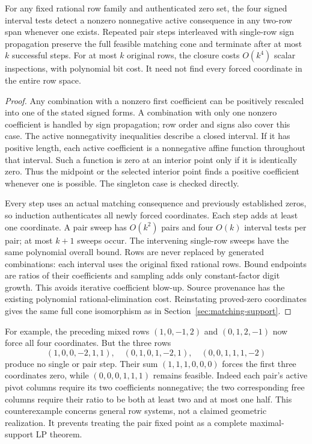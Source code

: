 \begin{proposition}
For any fixed rational row family and authenticated zero set, the four
signed interval tests detect a nonzero nonnegative active consequence in
any two-row span whenever one exists. Repeated pair steps interleaved with
single-row sign propagation preserve the full feasible matching cone and
terminate after at most $k$ successful steps. For at most $k$ original rows,
the closure costs $O(k^4)$ scalar inspections, with polynomial bit cost.
It need not find every forced coordinate in the entire row space.
\end{proposition}
\begin{proof}
Any combination with a nonzero first coefficient can be positively rescaled
into one of the stated signed forms. A combination with only one nonzero
coefficient is handled by sign propagation; row order and signs also cover
this case. The active nonnegativity inequalities describe a closed interval.
If it has positive length, each active coefficient is a nonnegative affine
function throughout that interval. Such a function is zero at an interior
point only if it is identically zero. Thus the midpoint or the selected
interior point finds a positive coefficient whenever one is possible.
The singleton case is checked directly.

Every step uses an actual matching consequence and previously established
zeros, so induction authenticates all newly forced coordinates. Each step
adds at least one coordinate. A pair sweep has $O(k^2)$ pairs and four
$O(k)$ interval tests per pair; at most $k+1$ sweeps occur. The intervening
single-row sweeps have the same polynomial overall bound. Rows are never
replaced by generated combinations: each interval uses the original fixed
rational rows. Bound endpoints are ratios of their coefficients and sampling
adds only constant-factor digit growth. This avoids iterative coefficient
blow-up. Source provenance has the existing polynomial rational-elimination
cost. Reinstating proved-zero coordinates gives the same full cone
isomorphism as in Section~\ref{sec:matching-support}.
\end{proof}

For example, the preceding mixed rows $(1,0,-1,2)$ and $(0,1,2,-1)$ now
force all four coordinates. But the three rows
\[
 (1,0,0,-2,1,1),\quad(0,1,0,1,-2,1),\quad(0,0,1,1,1,-2)
\]
produce no single or pair step. Their sum $(1,1,1,0,0,0)$ forces the first
three coordinates zero, while $(0,0,0,1,1,1)$ remains feasible. Indeed each
pair's active pivot columns require its two coefficients nonnegative;
the two corresponding free columns require their ratio to be both at least
two and at most one half. This counterexample concerns general row systems,
not a claimed geometric realization. It prevents treating the pair fixed
point as a complete maximal-support LP theorem.

